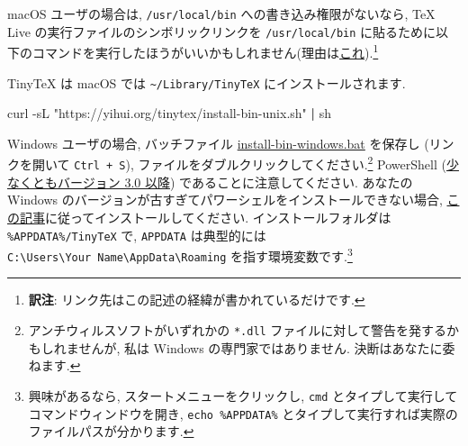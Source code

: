 \documentclass[
  xelatex,ja=standard,jafont=noto]{bxjsreport}
\newenvironment{Shaded}{\begin{snugshade}}{\end{snugshade}}
\newcommand{\AttributeTok}[1]{\textcolor[rgb]{0.77,0.63,0.00}{#1}}
\newcommand{\ExtensionTok}[1]{#1}
\newcommand{\FunctionTok}[1]{\textcolor[rgb]{0.00,0.00,0.00}{#1}}
\newcommand{\KeywordTok}[1]{\textcolor[rgb]{0.13,0.29,0.53}{\textbf{#1}}}
\newcommand{\NormalTok}[1]{#1}
\newcommand{\StringTok}[1]{\textcolor[rgb]{0.31,0.60,0.02}{#1}}
\newcommand{\VariableTok}[1]{\textcolor[rgb]{0.00,0.00,0.00}{#1}}
\begin{document}
macOS ユーザの場合は, \texttt{/usr/local/bin}
への書き込み権限がないなら, TeX Live
の実行ファイルのシンボリックリンクを \texttt{/usr/local/bin}
に貼るために以下のコマンドを実行したほうがいいかもしれません(理由は\href{https://github.com/yihui/tinytex/issues/188}{これ}).\footnote{\textbf{訳注}:
  リンク先はこの記述の経緯が書かれているだけです.}

\begin{Shaded}
\end{Shaded}

TinyTeX は macOS では \texttt{\textasciitilde{}/Library/TinyTeX}
にインストールされます.

\begin{Shaded}
\begin{Highlighting}[]
\ExtensionTok{curl} \AttributeTok{{-}sL} \StringTok{"https://yihui.org/tinytex/install{-}bin{-}unix.sh"} \KeywordTok{|} \FunctionTok{sh}
\end{Highlighting}
\end{Shaded}

Windows ユーザの場合, バッチファイル
\href{https://yihui.org/tinytex/install-bin-windows.bat}{install-bin-windows.bat}
を保存し (リンクを開いて \texttt{Ctrl\ +\ S}),
ファイルをダブルクリックしてください.\footnote{アンチウィルスソフトがいずれかの
  \texttt{*.dll} ファイルに対して警告を発するかもしれませんが, 私は
  Windows の専門家ではありません. 決断はあなたに委ねます.} PowerShell
(\href{https://docs.microsoft.com/en-us/powershell/scripting/setup/starting-windows-powershell-on-earlier-versions-of-windows}{少なくともバージョン
3.0 以降}) であることに注意してください. あなたの Windows
のバージョンが古すぎてパワーシェルをインストールできない場合,
\href{https://docs.microsoft.com/en-us/powershell/scripting/setup/starting-windows-powershell-on-earlier-versions-of-windows}{この記事}に従ってインストールしてください.
インストールフォルダは \texttt{\%APPDATA\%/TinyTeX} で, \texttt{APPDATA}
は典型的には
\texttt{C:\textbackslash{}Users\textbackslash{}Your\ Name\textbackslash{}AppData\textbackslash{}Roaming}
を指す環境変数です.\footnote{興味があるなら,
  スタートメニューをクリックし, \texttt{cmd}
  とタイプして実行してコマンドウィンドウを開き,
  \texttt{echo\ \%APPDATA\%}
  とタイプして実行すれば実際のファイルパスが分かります.}
\end{document}
